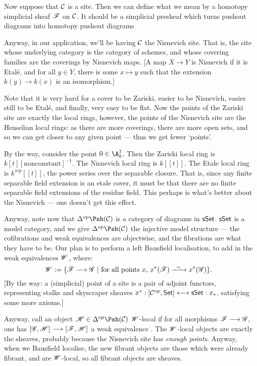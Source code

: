 \documentclass[11pt]{article}
\begin{document}
Now suppose that $\mathcal{C}$ is a site. Then we can define what we mean by a homotopy simplicial sheaf $\mathscr{F}$ on $\mathcal{C}$. It should be a simplicial presheaf which turns pushout diagrams into homotopy pushout diagrams \rednote{[actually, i reckon it should turn coequalisers of covering families into homotopy equalisers (i.e.\ limits), or something. I don't know.}

Anyway, in our application, we'll be having $\mathcal{C}$ the Nisnevich site. That is, the site whose underlying category is the category of schemes, and whose covering families are the coverings by Nisnevich maps. [A map $X\to Y$ is Nisnevich if it is Etal\'e, and for all $y\in Y$, there is some $x\mapsto y$ such that the extension $k(y)\to k(x)$ is an isomorphism.]

Note that it is very hard for a cover to be Zariski, easier to be Nisnevich, easier still to be Etal\'e, and finally, very easy to be flat. Now the points of the Zariski site are exactly the local rings, however, the points of the Nisnevich site are the Henselian local rings: as there are more coverings, there are more open sets, and so we can get closer to any given point --- thus we get fewer `points'.

By the way, consider the point $0\in\A^1_k$. Then the Zariski local ring is $k[t][\text{nonconstant}]^{-1}$. The Nisnevich local ring is $k[[t]]$. The Etale local ring is $k^{sep}[[t]]$, the power series over the separable closure. That is, since any finite separable field extension is an etale cover, it must be that there are no finite separable field extensions of the residue field. This perhaps is what's better about the Nisnevich --- one doesn't get this effect.

Anyway, note now that $\Delta^\op\Psh(\calC)$ is a category of diagrams in $\operatorname{{\mathsf{sSet}}}$. $\operatorname{{\mathsf{sSet}}}$ is a model category, and we give $\Delta^\op\Psh(\calC)$ the injective model structure --- the cofibrations and weak equivalences are objectwise, and the fibrations are what they have to be. Our plan is to perform a left Bausfield localisation, to add in the weak equivalences $\mathscr{W}$, where:
\[\scrW:=\{\scrF\to\scrG\ |\ \text{for all points $x$, $x^*(\scrF)\weakequiv x^*(\scrG)$}\}.\]
[By the way: a (simplicial) point of a site is a pair of adjoint functors, representing stalks and skyscraper sheaves $x^*:[\mathcal{C}^{\textup{op}},\operatorname{{\mathsf{Set}}}]\longleftrightarrow\operatorname{{\mathsf{sSet}}}:x_*$, satisfying some more axioms.]

Anyway, call an object $\scrH\in\Delta^\op\Psh(\calC)$ $\mathscr{W}$-local if for all morphisms $\mathscr{F}\longrightarrow\mathscr{G}$, one has $[\mathscr{G},\mathscr{H}]\longrightarrow[\mathscr{F},\mathscr{H}]$ a weak equivalence . The $\mathscr{W}$-local objects are exactly the sheaves, probably because the Nisnevich site has \emph{enough points}. Anyway, when we Bausfield localise, the new fibrant objects are those which were already fibrant, and are $\mathscr{W}$-local, so all fibrant objects are sheaves.
\end{document}
